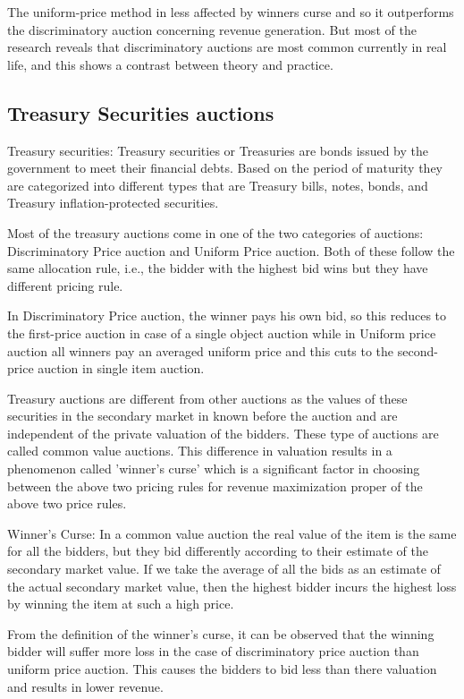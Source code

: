 \documentclass[a4paper]{article}
\begin{document}
The uniform-price method in less affected by winners curse and so it outperforms the discriminatory auction concerning revenue generation. But most of the research reveals that discriminatory auctions are most common currently in real life, and this shows a contrast between theory and practice.


\subsection*{Treasury Securities auctions}

Treasury securities: Treasury securities or Treasuries are bonds issued by the government to meet their financial debts. Based on the period of maturity they are categorized into different types that are Treasury bills, notes, bonds, and Treasury inflation-protected securities.

Most of the treasury auctions come in one of the two categories of auctions: Discriminatory Price auction and Uniform Price auction. Both of these follow the same allocation rule, i.e., the bidder with the highest bid wins but they have different pricing rule.

In Discriminatory Price auction, the winner pays his own bid, so this reduces to the first-price auction in case of a single object auction while in Uniform price auction all winners pay an averaged uniform price and this cuts to the second-price auction in single item auction.

Treasury auctions are different from other auctions as the values of these securities in the secondary market in known before the auction and are independent of the private valuation of the bidders. These type of auctions are called common value auctions. This difference in valuation results in a phenomenon called 'winner's curse' which is a significant factor in choosing between the above two pricing rules for revenue maximization proper of the above two price rules.

Winner's Curse: In a common value auction the real value of the item is the same for all the bidders, but they bid differently according to their estimate of the secondary market value. If we take the average of all the bids as an estimate of the actual secondary market value, then the highest bidder incurs the highest loss by winning the item at such a high price.

From the definition of the winner's curse, it can be observed that the winning bidder will suffer more loss in the case of discriminatory price auction than uniform price auction. This causes the bidders to bid less than there valuation and results in lower revenue.
\end{document}
